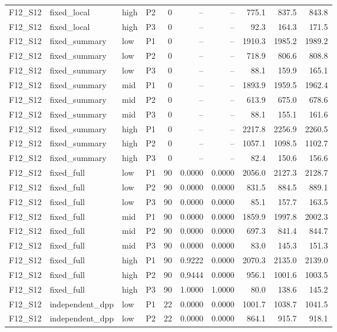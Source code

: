 \begin{longtable}{llllrrrrrr}
F12\_S12 & fixed\_local & high & P2 & 0 & -- & -- & 775.1 & 837.5 & 843.8 \\
F12\_S12 & fixed\_local & high & P3 & 0 & -- & -- & 92.3 & 164.3 & 171.5 \\
F12\_S12 & fixed\_summary & low & P1 & 0 & -- & -- & 1910.3 & 1985.2 & 1989.2 \\
F12\_S12 & fixed\_summary & low & P2 & 0 & -- & -- & 718.9 & 806.6 & 808.8 \\
F12\_S12 & fixed\_summary & low & P3 & 0 & -- & -- & 88.1 & 159.9 & 165.1 \\
F12\_S12 & fixed\_summary & mid & P1 & 0 & -- & -- & 1893.9 & 1959.5 & 1962.4 \\
F12\_S12 & fixed\_summary & mid & P2 & 0 & -- & -- & 613.9 & 675.0 & 678.6 \\
F12\_S12 & fixed\_summary & mid & P3 & 0 & -- & -- & 88.1 & 155.1 & 161.6 \\
F12\_S12 & fixed\_summary & high & P1 & 0 & -- & -- & 2217.8 & 2256.9 & 2260.5 \\
F12\_S12 & fixed\_summary & high & P2 & 0 & -- & -- & 1057.1 & 1098.5 & 1102.7 \\
F12\_S12 & fixed\_summary & high & P3 & 0 & -- & -- & 82.4 & 150.6 & 156.6 \\
F12\_S12 & fixed\_full & low & P1 & 90 & 0.0000 & 0.0000 & 2056.0 & 2127.3 & 2128.7 \\
F12\_S12 & fixed\_full & low & P2 & 90 & 0.0000 & 0.0000 & 831.5 & 884.5 & 889.1 \\
F12\_S12 & fixed\_full & low & P3 & 90 & 0.0000 & 0.0000 & 85.1 & 157.7 & 163.5 \\
F12\_S12 & fixed\_full & mid & P1 & 90 & 0.0000 & 0.0000 & 1859.9 & 1997.8 & 2002.3 \\
F12\_S12 & fixed\_full & mid & P2 & 90 & 0.0000 & 0.0000 & 697.3 & 841.4 & 844.7 \\
F12\_S12 & fixed\_full & mid & P3 & 90 & 0.0000 & 0.0000 & 83.0 & 145.3 & 151.3 \\
F12\_S12 & fixed\_full & high & P1 & 90 & 0.9222 & 0.0000 & 2070.3 & 2135.0 & 2139.0 \\
F12\_S12 & fixed\_full & high & P2 & 90 & 0.9444 & 0.0000 & 956.1 & 1001.6 & 1003.5 \\
F12\_S12 & fixed\_full & high & P3 & 90 & 1.0000 & 1.0000 & 80.0 & 138.6 & 145.2 \\
F12\_S12 & independent\_dpp & low & P1 & 22 & 0.0000 & 0.0000 & 1001.7 & 1038.7 & 1041.5 \\
F12\_S12 & independent\_dpp & low & P2 & 22 & 0.0000 & 0.0000 & 864.1 & 915.7 & 918.1 \\

\end{longtable}
